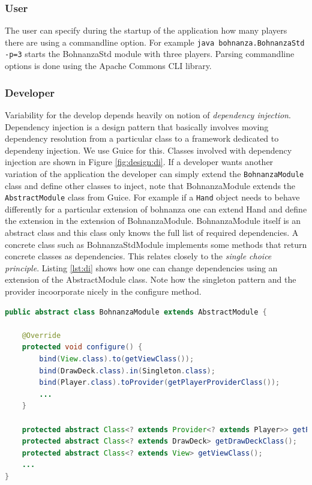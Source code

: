 \subsubsection{User}
The user can specify during the startup of the application how many players there are using a
commandline option. For example \texttt{java bohnanza.BohnanzaStd -p=3} starts the BohnanzaStd
module with three players. Parsing commandline options is done using the Apache Commons CLI library.

\subsubsection{Developer}
Variability for the develop depends heavily on notion of \emph{dependency injection}. Dependency
injection is a design pattern that basically involves moving dependency resolution from a particular
class to a framework dedicated to dependeny injection. We use Guice for this. Classes involved with dependency injection are shown in
Figure \ref{fig:design:di}. If a developer wants another variation of the application the developer can simply extend the
\texttt{BohnanzaModule} class and define other classes to inject, note that BohnanzaModule
extends the \texttt{AbstractModule} class from Guice. For example if a \texttt{Hand} object needs
to behave differently for a particular extension of bohnanza one can extend Hand and
define the extension in the extension of BohnanzaModule. BohnanzaModule itself is
an abstract class and this class only knows the full list of required dependencies. A concrete class
such as BohnanzaStdModule implements some methods that return concrete classes as
dependencies. This relates closely to the \emph{single choice principle}. Listing \ref{lst:di} shows how one can change dependencies using
an extension of the AbstractModule class. Note how the singleton pattern and the provider incoorporate nicely in the configure method.

\begin{lstlisting}[language=Java, caption=BohnanzaModule.java, label=lst:di]
public abstract class BohnanzaModule extends AbstractModule {

    @Override
    protected void configure() {
        bind(View.class).to(getViewClass());
        bind(DrawDeck.class).in(Singleton.class);
        bind(Player.class).toProvider(getPlayerProviderClass());
        ...
    }

    protected abstract Class<? extends Provider<? extends Player>> getPlayerProviderClass();
    protected abstract Class<? extends DrawDeck> getDrawDeckClass();
    protected abstract Class<? extends View> getViewClass();    
    ...
}
\end{lstlisting}


